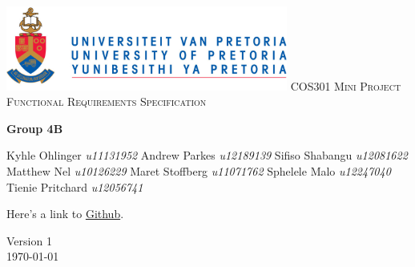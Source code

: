 \begin{titlepage}
\begin{center}
\includegraphics[width=350px]{University_of_Pretoria_Logo.PNG}\newline
\textsc{\LARGE COS301 Mini Project Functional Requirements Specification}\newline


\textbf{Group 4B} \\
\begin{flushright} \large
Kyhle Ohlinger \emph{u11131952} \newline
Andrew Parkes \emph{u12189139} \newline
Sifiso Shabangu \emph{u12081622} \newline
Matthew Nel \emph{u10126229} \newline
Maret Stoffberg \emph{u11071762} \newline
Sphelele Malo \emph{u12247040} \newline
Tienie Pritchard \emph{u12056741} \newline \newline \newline
\end{flushright}
Here's a link to \href{https://github.com/KyhleOhlinger/COS301-Group-4_B.git}{Github}.


\vfill

{\large Version 1}
\\
{\large \today}

\end{center}
\end{titlepage}
